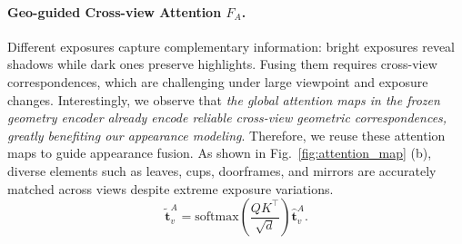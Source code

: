 \documentclass[runningheads]{llncs}
\begin{document}

\paragraph{\textbf{Geo-guided Cross-view Attention $F_A$.}}
Different exposures capture complementary information: bright exposures reveal shadows while dark ones preserve highlights.
Fusing them requires cross-view correspondences, which are challenging under large viewpoint and exposure changes.
Interestingly, we observe that \textit{the global attention maps in the frozen geometry encoder already encode reliable cross-view geometric correspondences, greatly benefiting our appearance modeling}.
Therefore, we reuse these attention maps to guide appearance fusion.
As shown in Fig.~\ref{fig:attention_map} (b), diverse elements such as leaves, cups, doorframes, and mirrors are accurately matched across views despite extreme exposure variations.
\begin{equation}
    \tilde{\boldsymbol{t}}_v^{A}
    = \mathrm{softmax}\!\left(\frac{Q K^{\!\top}}{\sqrt{d}}\right) \hat{\boldsymbol{t}}_v^{A}.
\end{equation}
\end{document}

